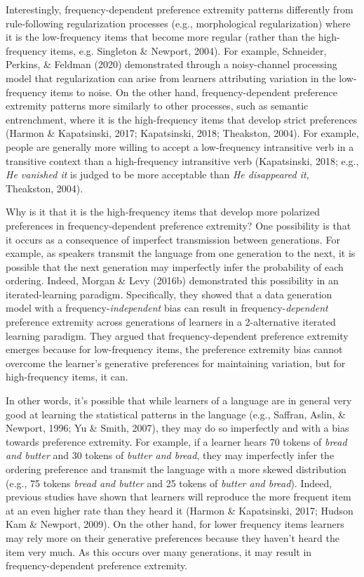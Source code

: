 \documentclass[10pt, letterpaper]{article}
\begin{document}
Interestingly, frequency-dependent preference extremity patterns
differently from rule-following regularization processes (e.g.,
morphological regularization) where it is the low-frequency items that
become more regular (rather than the high-frequency items, e.g.
Singleton \& Newport, 2004). For example, Schneider, Perkins, \& Feldman
(2020) demonstrated through a noisy-channel processing model that
regularization can arise from learners attributing variation in the
low-frequency items to noise. On the other hand, frequency-dependent
preference extremity patterns more similarly to other processes, such as
semantic entrenchment, where it is the high-frequency items that develop
strict preferences (Harmon \& Kapatsinski, 2017; Kapatsinski, 2018;
Theakston, 2004). For example, people are generally more willing to
accept a low-frequency intransitive verb in a transitive context than a
high-frequency intransitive verb (Kapatsinski, 2018; e.g., \emph{He
vanished it} is judged to be more acceptable than \emph{He disappeared
it,} Theakston, 2004).

Why is it that it is the high-frequency items that develop more
polarized preferences in frequency-dependent preference extremity? One
possibility is that it occurs as a consequence of imperfect transmission
between generations. For example, as speakers transmit the language from
one generation to the next, it is possible that the next generation may
imperfectly infer the probability of each ordering. Indeed, Morgan \&
Levy (2016b) demonstrated this possibility in an iterated-learning
paradigm. Specifically, they showed that a data generation model with a
frequency-\emph{independent} bias can result in
frequency-\emph{dependent} preference extremity across generations of
learners in a 2-alternative iterated learning paradigm. They argued that
frequency-dependent preference extremity emerges because for
low-frequency items, the preference extremity bias cannot overcome the
learner's generative preferences for maintaining variation, but for
high-frequency items, it can.

In other words, it's possible that while learners of a language are in
general very good at learning the statistical patterns in the language
(e.g., Saffran, Aslin, \& Newport, 1996; Yu \& Smith, 2007), they may do
so imperfectly and with a bias towards preference extremity. For
example, if a learner hears 70 tokens of \emph{bread and butter} and 30
tokens of \emph{butter and bread}, they may imperfectly infer the
ordering preference and transmit the language with a more skewed
distribution (e.g., 75 tokens \emph{bread and butter} and 25 tokens of
\emph{butter and bread}). Indeed, previous studies have shown that
learners will reproduce the more frequent item at an even higher rate
than they heard it (Harmon \& Kapatsinski, 2017; Hudson Kam \& Newport,
2009). On the other hand, for lower frequency items learners may rely
more on their generative preferences because they haven't heard the item
very much. As this occurs over many generations, it may result in
frequency-dependent preference extremity.
\end{document}
